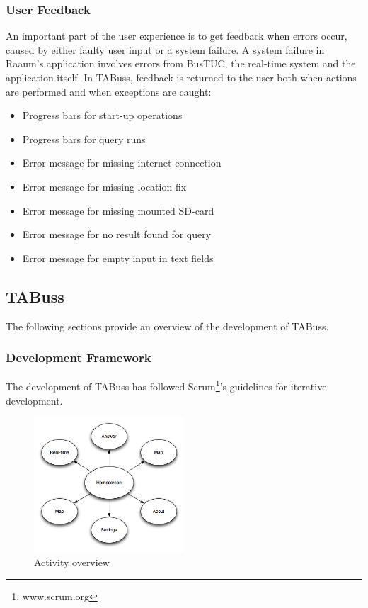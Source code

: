 \subsubsection{User Feedback}
An important part of the user experience is to get feedback when errors occur, caused by either faulty user input or a system failure. A system failure in Raaum's application involves errors from BusTUC, the real-time system and the application itself.
In TABuss, feedback is returned to the user both when actions are performed and when exceptions are caught:

\begin{itemize} 
    \item{Progress bars for start-up operations}
    \item{Progress bars for query runs}
    \item{Error message for missing internet connection}
    \item{Error message for missing location fix}
    \item{Error message for missing mounted SD-card}
    \item{Error message for no result found for query}
    \item{Error message for empty input in text fields}
\end{itemize}


\subsection{TABuss}
The following sections provide an overview of the development of TABuss.

\subsubsection{Development Framework}
The development of TABuss has followed Scrum\footnote{www.scrum.org}'s guidelines for iterative development.

\begin{figure}[!h]
\begin{center}
\includegraphics[width = 0.5\textwidth]{Method/Figures/homescreen.png}
\caption{Activity overview}
\label{fig:homescreen}
\end{center}
\end{figure}

